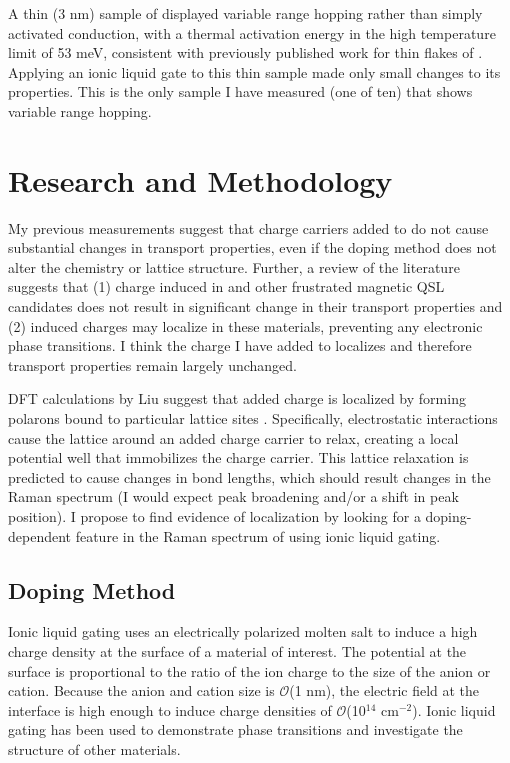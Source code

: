 \documentclass[11pt]{article}
\begin{document}
\begin{multicols}{2}
A thin (3 nm) sample of \rucl displayed variable range hopping rather than simply activated conduction, with a thermal activation energy in the high temperature limit of 53 meV, consistent with previously published work for thin flakes of \rucl \cite{Mashhadi2018}. Applying an ionic liquid gate to this thin sample made only small changes to its properties. This is the only sample I have measured (one of ten) that shows variable range hopping.

\section{Research and Methodology}

My previous measurements suggest that charge carriers added to \rucl do not cause substantial changes in transport properties, even if the doping method does not alter the chemistry or lattice structure. Further, a review of the literature suggests that (1) charge induced in \rucl and other frustrated magnetic QSL candidates does not result in significant change in their transport properties and (2) induced charges may localize in these materials, preventing any electronic phase transitions. I think the charge I have added to \rucl localizes and therefore transport properties remain largely unchanged.

DFT calculations by Liu suggest that added charge is localized by forming polarons bound to particular lattice sites \cite{Liu2018}. Specifically, electrostatic interactions cause the lattice around an added charge carrier to relax, creating a local potential well that immobilizes the charge carrier. This lattice relaxation is predicted to cause changes in bond lengths, which should result changes in the Raman spectrum (I would expect peak broadening and/or a shift in peak position). I propose to find evidence of localization by looking for a doping-dependent feature in the Raman spectrum of \rucl using ionic liquid gating.

\subsection{Doping Method}

Ionic liquid gating uses an electrically polarized molten salt to induce a high charge density at the surface of a material of interest. The potential at the surface is proportional to the ratio of the ion charge to the size of the anion or cation. Because the anion and cation size is $\mathcal{O}$(1 nm), the electric field at the interface is high enough to induce charge densities of $\mathcal{O}$(10$^{14}$ cm$^{-2}$). Ionic liquid gating has been used to demonstrate phase transitions and investigate the structure of other materials\cite{Braga2012,Ueno2008}.


\end{multicols}
\end{document}
